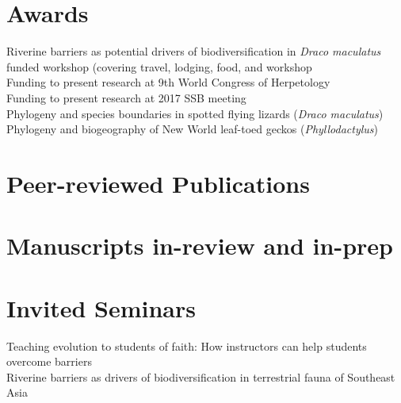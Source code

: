 \documentclass[11pt,a4paper,sans]{moderncv}        %
\begin{document}
\section{Awards}
\small{\tabto{1.25cm}Riverine barriers as potential drivers of biodiversification in \textit{Draco maculatus}} \\
\small{\tabto{1.25cm}funded workshop (covering travel, lodging, food, and workshop} \\
\small{\tabto{1.25cm}Funding to present research at 9th World Congress of Herpetology} \\
\small{\tabto{1.25cm}Funding to present research at 2017 SSB meeting} \\
\small{\tabto{1.25cm}Phylogeny and species boundaries in spotted flying lizards (\textit{Draco maculatus})} \\
\small{\tabto{1.25cm}Phylogeny and biogeography of New World leaf-toed geckos (\textit{Phyllodactylus})} \\

\section{Peer-reviewed Publications}
\begin{refsection}
\nocite{*}
\printbibliography[heading=none]
\end{refsection}

\section{Manuscripts in-review and in-prep}
\begin{refsection}
\nocite{*}
\printbibliography[heading=none]
\end{refsection}

\section{Invited Seminars}
\small{}
\footnotesize{\tabto{1.25cm}Teaching evolution to students of faith: How instructors can help students overcome barriers} \\
\small{}
\footnotesize{\tabto{1.25cm}Riverine barriers as drivers of biodiversification in terrestrial fauna of Southeast Asia}
\small{\tabto{1.25cm}}
\end{document}
